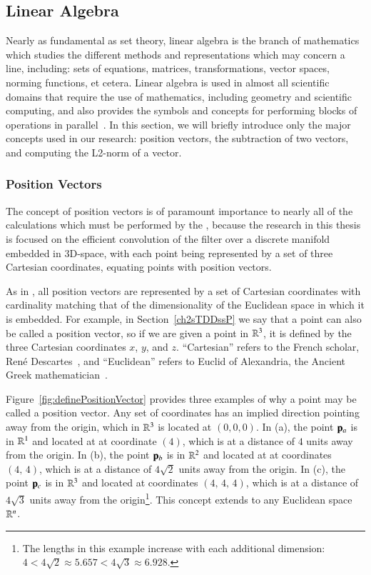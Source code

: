 \subsection{Linear Algebra}
\label{ch2sETBssLA}
Nearly as fundamental as set theory, linear algebra is the branch of mathematics which studies the different methods and representations which may concern a line, including: sets of equations, matrices, transformations, vector spaces, norming functions, et cetera. Linear algebra is used in almost all scientific domains that require the use of mathematics, including geometry and scientific computing, and also provides the symbols and concepts for performing blocks of operations in parallel~\cite{Weisstein19i}. In this section, we will briefly introduce only the major concepts used in our research: position vectors, the subtraction of two vectors, and computing the L2-norm of a vector.

%
%
\subsubsection{Position Vectors}
\label{ch2sETBssLAsssPV}
The concept of position vectors is of paramount importance to nearly all of the calculations which must be performed by the , because the research in this thesis is focused on the efficient convolution of the filter over a discrete manifold embedded in 3D-space, with each point being represented by a set of three Cartesian coordinates, equating points with position vectors.

As in \tdd{}, all position vectors are represented by a set of Cartesian coordinates with cardinality matching that of the dimensionality of the Euclidean space in which it is embedded. For example, in Section~\ref{ch2sTDDssP} we say that a point can also be called a position vector, so if we are given a point in $\mathbb{R}^{3}$, it is defined by the three Cartesian coordinates $x$, $y$, and $z$. ``Cartesian'' refers to the French scholar, René Descartes~\cite{EB1}, and ``Euclidean'' refers to Euclid of Alexandria, the Ancient Greek mathematician~\cite{EB2}.

Figure~\ref{fig:definePositionVector} provides three examples of why a point may be called a position vector. Any set of coordinates has an implied direction pointing away from the origin, which in $\mathbb{R}^{3}$ is located at $(0, 0, 0)$. In (a), the point $\mathbf{p}_a$ is in $\mathbb{R}^{1}$ and located at at coordinate $(4)$, which is at a distance of $4$ units away from the origin. In (b), the point $\mathbf{p}_b$ is in $\mathbb{R}^{2}$ and located at at coordinates $(4,\,4)$, which is at a distance of $4\sqrt{2}$ units away from the origin. In (c), the point $\mathbf{p}_c$ is in $\mathbb{R}^{3}$ and located at coordinates $(4,\,4,\,4)$, which is at a distance of $4\sqrt{3}$ units away from the origin\footnote{The lengths in this example increase with each additional dimension: $4 < 4\sqrt{2} \approx 5.657 < 4\sqrt{3} \approx 6.928$.}. This concept extends to any Euclidean space $\mathbb{R}^{n}$.

